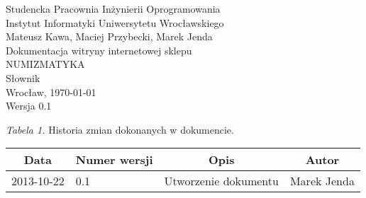 \documentclass [11pt, a4paper, leqno]	{article}				%
\begin{document}

\begin {center}
\thispagestyle {empty} 					%
{\large Studencka Pracownia Inżynierii Oprogramowania} 	\\ [0.5cm]
{\large Instytut Informatyki Uniwersytetu Wrocławskiego} 	\\ [6.0cm]

{\large Mateusz Kawa, Maciej Przybecki, Marek Jenda} 	\\ [1.5cm]

{\huge Dokumentacja witryny internetowej sklepu} 		\\ [0.5cm]
{\huge NUMIZMATYKA} 						\\ [1.5cm]

{\large Słownik} 							\\ [0.5cm]

\vfill
{\large Wrocław, \today}						\\ [0.5cm]
{\large Wersja 0.1}
\end {center}

\newpage

\textit{Tabela 1.} Historia zmian dokonanych w dokumencie.
\begin{center}
\begin{tabular}{| l | l | l | l |}
\hline
	\multicolumn{1}{|c|}{Data} & \multicolumn{1}{|c|}{Numer wersji} &  \multicolumn{1}{|c|}{Opis} & \multicolumn{1}{|c|}{Autor} \\ \hline \hline
	2013-10-22 & 0.1 & Utworzenie dokumentu & Marek Jenda \\ \hline
\end{tabular}
\end{center}
\newpage
\end{document}
